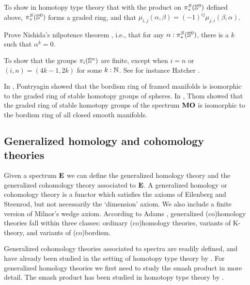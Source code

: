 \documentclass[reqno]{amsart}
\begin{document}
\begin{proposal}\label{p:ring_structure_on_stems}
To show in homotopy type theory that with the product on $\pi_\ast^S(\mathbb{S}^{0})$ defined above, $\pi_\ast^S(\mathbb{S}^{0})$ forms a graded ring, and that $\mu_{i,j}(\alpha,\beta)=(-1)^{ij}\mu_{j,i}(\beta,\alpha)$. 

Prove Nishida's nilpotence theorem \cite{Nishida73}, i.e., that for any $\alpha:\pi_\ast^S(\mathbb{S}^{0})$, there is a $k$ such that $\alpha^k=0$. 
\end{proposal}

\begin{proposal}\label{p:homotopy_groups_of_spheres_finite}
To show that the groups $\pi_i(\mathbb{S}^{n})$ are finite, except when $i=n$ or $(i,n)=(4k-1,2k)$ for some $k:\mathbb{N}$. See for instance Hatcher \cite{HatcherSSAT}. 
\end{proposal}

In \cite{Pontryagin59}, Pontryagin showed that the bordism ring of framed manifolds is isomorphic to the graded ring of stable homotopy groups of spheres. In \cite{Thom54}, Thom showed that the graded ring of stable homotopy groups of the spectrum $\mathbf{MO}$ is isomorphic to the bordism ring of all closed smooth manifolds. 

\subsection{Generalized homology and cohomology theories}
Given a spectrum $\mathbf{E}$ we can define the generalized homology theory and the generalized cohomology theory associated to $\mathbf{E}$.
A generalized homology or cohomology theory is a functor which satisfies the axioms of Eilenberg and Steenrod, but not necessarily the `dimension' axiom. We also include a finite version of Milnor's wedge axiom. According to Adams \cite{Adams78}, generalized (co)homology theories fall within three classes: ordinary (co)homology theories, variants of K-theory, and variants of (co)bordism. 

Generalized cohomology theories associated to spectra are readily defined, and have already been studied in the setting of homotopy type theory by \cite{Shulman13Cohomology}. For generalized homology theories we first need to study the smash product in more detail. The smash product has been studied in homotopy type theory by \cite{Brunerie16}. 
\end{document}
